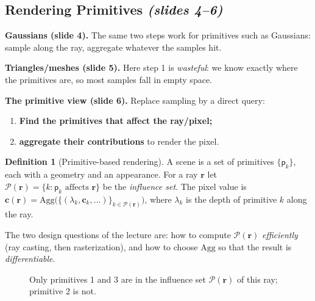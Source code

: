 \documentclass[11pt,a4paper]{article}
\newcommand{\sr}[1]{\texorpdfstring{\emph{(#1)}}{(#1)}}
\theoremstyle{definition}
\newtheorem{definition}{Definition}[section]
\theoremstyle{algstyle}
\theoremstyle{plain}
\theoremstyle{remark}
\newcommand{\eye}[2]{\begin{scope}[shift={(#1,#2)}]
  \draw[thick,fill=white] (0,0) to[bend left=45] (0.7,0) to[bend left=45] (0,0);
  \fill[blue!45] (0.35,0) circle (0.09);\end{scope}}
\newcommand{\blob}[6]{\begin{scope}[shift={(#1,#2)},rotate=#5]
  \shade[inner color=#6,outer color=#6!4] (0,0) ellipse (#3 and #4);\end{scope}}
\begin{document}
\subsection{Rendering Primitives \sr{slides 4--6}}
\textbf{Gaussians (slide 4).} The same two steps work for primitives such as Gaussians: sample along the ray, aggregate whatever the samples hit.

\textbf{Triangles/meshes (slide 5).} Here step 1 is \emph{wasteful}: we know exactly where the primitives are, so most samples fall in empty space.

\textbf{The primitive view (slide 6).} Replace sampling by a direct query:
\begin{enumerate}[nosep]
\item \textbf{Find the primitives that affect the ray/pixel;}
\item \textbf{aggregate their contributions} to render the pixel.
\end{enumerate}

\begin{definition}[Primitive-based rendering]
A scene is a set of primitives $\{\mathsf p_k\}$, each with a geometry and an appearance. For a ray $\bm r$ let $\mathcal P(\bm r)=\{k:\mathsf p_k\text{ affects }\bm r\}$ be the \emph{influence set}. The pixel value is $\bm c(\bm r)=\mathrm{Agg}\big(\{(\lambda_k,\bm c_k,\dots)\}_{k\in\mathcal P(\bm r)}\big)$, where $\lambda_k$ is the depth of primitive $k$ along the ray.
\end{definition}

\begin{intuition}
The two design questions of the lecture are: how to compute $\mathcal P(\bm r)$ \emph{efficiently} (ray casting, then rasterization), and how to choose $\mathrm{Agg}$ so that the result is \emph{differentiable}.
\end{intuition}

\begin{figure}[htbp]
\centering
{}
\caption{Only primitives 1 and 3 are in the influence set $\mathcal P(\bm r)$ of this ray; primitive 2 is not.}
\end{figure}
\end{document}
